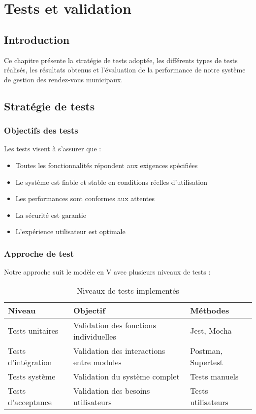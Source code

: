 \chapter{Tests et validation}

\section{Introduction}

Ce chapitre présente la stratégie de tests adoptée, les différents types de tests réalisés, les résultats obtenus et l'évaluation de la performance de notre système de gestion des rendez-vous municipaux.

\section{Stratégie de tests}

\subsection{Objectifs des tests}

Les tests visent à s'assurer que :
\begin{itemize}
    \item Toutes les fonctionnalités répondent aux exigences spécifiées
    \item Le système est fiable et stable en conditions réelles d'utilisation
    \item Les performances sont conformes aux attentes
    \item La sécurité est garantie
    \item L'expérience utilisateur est optimale
\end{itemize}

\subsection{Approche de test}

Notre approche suit le modèle en V avec plusieurs niveaux de tests :

\begin{table}[h]
\centering
\begin{tabular}{|l|p{4cm}|p{4cm}|}
\hline
\textbf{Niveau} & \textbf{Objectif} & \textbf{Méthodes} \\
\hline
Tests unitaires & Validation des fonctions individuelles & Jest, Mocha \\
\hline
Tests d'intégration & Validation des interactions entre modules & Postman, Supertest \\
\hline
Tests système & Validation du système complet & Tests manuels \\
\hline
Tests d'acceptance & Validation des besoins utilisateurs & Tests utilisateurs \\
\hline
\end{tabular}
\caption{Niveaux de tests implementés}
\label{tab:test_levels}
\end{table}

